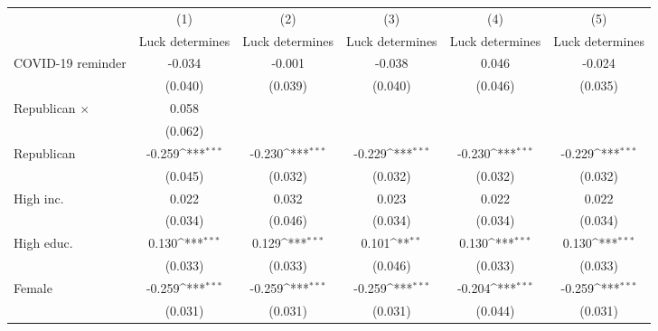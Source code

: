 {
\def\sym#1{\ifmmode^{#1}\else\(^{#1}\)\fi}
\begin{tabular}{l*{5}{c}}
\toprule
                    &\multicolumn{1}{c}{(1)}&\multicolumn{1}{c}{(2)}&\multicolumn{1}{c}{(3)}&\multicolumn{1}{c}{(4)}&\multicolumn{1}{c}{(5)}\\
                    &\multicolumn{1}{c}{Luck determines}&\multicolumn{1}{c}{Luck determines}&\multicolumn{1}{c}{Luck determines}&\multicolumn{1}{c}{Luck determines}&\multicolumn{1}{c}{Luck determines}\\
\midrule
COVID-19 reminder   &      -0.034         &      -0.001         &      -0.038         &       0.046         &      -0.024         \\
                    &     (0.040)         &     (0.039)         &     (0.040)         &     (0.046)         &     (0.035)         \\
\addlinespace
Republican $\times$ &       0.058         &                     &                     &                     &                     \\
                    &     (0.062)         &                     &                     &                     &                     \\
\addlinespace
Republican          &      -0.259\sym{***}&      -0.230\sym{***}&      -0.229\sym{***}&      -0.230\sym{***}&      -0.229\sym{***}\\
                    &     (0.045)         &     (0.032)         &     (0.032)         &     (0.032)         &     (0.032)         \\
\addlinespace
High inc.           &       0.022         &       0.032         &       0.023         &       0.022         &       0.022         \\
                    &     (0.034)         &     (0.046)         &     (0.034)         &     (0.034)         &     (0.034)         \\
\addlinespace
High educ.          &       0.130\sym{***}&       0.129\sym{***}&       0.101\sym{**} &       0.130\sym{***}&       0.130\sym{***}\\
                    &     (0.033)         &     (0.033)         &     (0.046)         &     (0.033)         &     (0.033)         \\
\addlinespace
Female              &      -0.259\sym{***}&      -0.259\sym{***}&      -0.259\sym{***}&      -0.204\sym{***}&      -0.259\sym{***}\\
                    &     (0.031)         &     (0.031)         &     (0.031)         &     (0.044)         &     (0.031)         \\

\end{tabular}}
